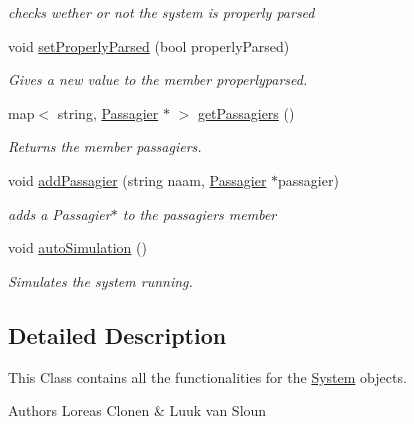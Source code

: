 \begin{DoxyCompactItemize}
\begin{DoxyCompactList}\small\item\em checks wether or not the system is properly parsed \end{DoxyCompactList}\item 
void \hyperlink{classSystem_af140010428a79ddde06f3546e7737d86}{set\+Properly\+Parsed} (bool properly\+Parsed)\hypertarget{classSystem_af140010428a79ddde06f3546e7737d86}{}\label{classSystem_af140010428a79ddde06f3546e7737d86}

\begin{DoxyCompactList}\small\item\em Gives a new value to the member properlyparsed. \end{DoxyCompactList}\item 
map$<$ string, \hyperlink{classPassagier}{Passagier} $\ast$ $>$ \hyperlink{classSystem_a25bf1c319312604ce89890fa827f4552}{get\+Passagiers} ()
\begin{DoxyCompactList}\small\item\em Returns the member passagiers. \end{DoxyCompactList}\item 
void \hyperlink{classSystem_ad2a3016a3d4cf9273cf8156f4fc69dfb}{add\+Passagier} (string naam, \hyperlink{classPassagier}{Passagier} $\ast$passagier)
\begin{DoxyCompactList}\small\item\em adds a Passagier$\ast$ to the passagiers member \end{DoxyCompactList}\item 
void \hyperlink{classSystem_ae392bbed93678914f3b0aff18c4a6d4d}{auto\+Simulation} ()\hypertarget{classSystem_ae392bbed93678914f3b0aff18c4a6d4d}{}\label{classSystem_ae392bbed93678914f3b0aff18c4a6d4d}

\begin{DoxyCompactList}\small\item\em Simulates the system running. \end{DoxyCompactList}\end{DoxyCompactItemize}


\subsection{Detailed Description}
This Class contains all the functionalities for the \hyperlink{classSystem}{System} objects. 

\begin{DoxyAuthor}{Authors}
Loreas Clonen \& Luuk van Sloun 
\end{DoxyAuthor}


